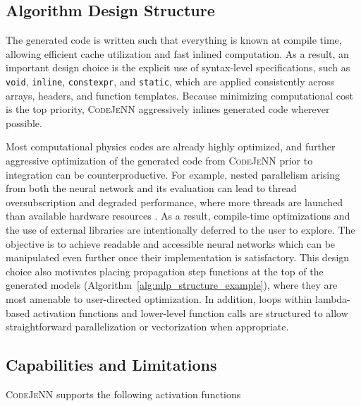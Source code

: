 \documentclass[preprint,12pt, a4paper]{elsarticle}
\begin{document}
\subsection{Algorithm Design Structure}
\label{sec:alg_struct_specs}
The generated code is written such that everything is known at compile time, allowing efficient cache utilization and fast inlined computation. As a result, an important design choice is the explicit use of syntax-level specifications, such as \texttt{void}, \texttt{inline}, \texttt{constexpr}, and \texttt{static}, which are applied consistently across arrays, headers, and function templates. Because minimizing computational cost is the top priority, \textsc{CodeJeNN} aggressively inlines generated code wherever possible.

Most computational physics codes are already highly optimized, and further aggressive optimization of the generated code from \textsc{CodeJeNN} prior to integration can be counterproductive. For example, nested parallelism arising from both the neural network and its evaluation can lead to thread oversubscription and degraded performance, where more threads are launched than available hardware resources \cite{yan_proposal_2016}. As a result, compile-time optimizations and the use of external libraries are intentionally deferred to the user to explore. The objective is to achieve readable and accessible neural networks which can be manipulated even further once their implementation is satisfactory. This design choice also motivates placing propagation step functions at the top of the generated models (Algorithm~\ref{alg:mlp_structure_example}), where they are most amenable to user-directed optimization. In addition, loops within lambda-based activation functions and lower-level function calls are structured to allow straightforward parallelization or vectorization when appropriate.

\subsection{Capabilities and Limitations}
\textsc{CodeJeNN} supports the following activation functions
\end{document}
